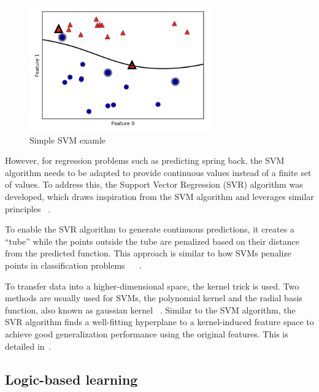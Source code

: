 \begin{figure}[H]
    \begin{tcolorbox}[arc=0pt,boxrule=0.5pt]
        \centering
        \includegraphics[width=0.7\textwidth]{chap4/images/svm_example}
    \end{tcolorbox}
    \caption{Simple \ac{SVM} examle~\cite[p. 94]{muller_introductionmachinelearning_2016}}
    \label{fig:svm-example}
\end{figure}

However, for regression problems such as predicting spring back, the \ac{SVM} algorithm
needs to be adapted to provide continuous values instead of a finite set of values.
To address this, the Support Vector Regression (SVR) algorithm was developed, which draws inspiration from the
\ac{SVM} algorithm and leverages similar principles
~\cite[p. 92]{muller_introductionmachinelearning_2016}.

To enable the \ac{SVR} algorithm to generate continuous predictions, it creates a ``tube''
while the points outside the tube are penalized based on their distance from the
predicted function.
This approach is similar to how \ac{SVM}s penalize points in classification
problems
~\cite[p. 369]{montesinoslopez_supportvectormachines_2022}
~\cite[pp. 67--68]{awad_efficientlearningmachines_2015}.

To transfer data into a higher-dimensional space, the kernel trick is used.
Two methods are usually used for \ac{SVM}s, the polynomial kernel and the radial basis
function, also known as gaussian kernel
~\cite[p. 97--98]{muller_introductionmachinelearning_2016}.
Similar to the \ac{SVM} algorithm, the \ac{SVR} algorithm finds a well-fitting hyperplane to a
kernel-induced feature space to achieve good generalization performance using the original
features.
This is detailed in~\cite[p. 369]{montesinoslopez_supportvectormachines_2022}.

\subsection{Logic-based learning}\label{subsec:logic-based-learning}

